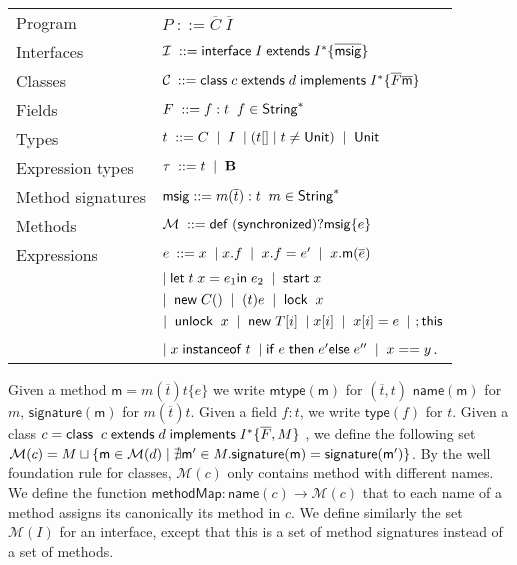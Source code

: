 \documentclass[a4paper, 11pt, english]{article}
\begin{document}
\begin{tabular}{l l}
Program  & $ P \; ::= \overline{C} \; \overline{I}$ \\
Interfaces & $\mathcal{I} \; :: = \mathsf{interface}{} \; I \; \mathsf{extends} \; I^* \{ \overline{\mathsf{msig}} \} $\\
Classes & $ \mathcal{C} \: ::= \mathsf{class} \;{} c \; \mathsf{extends} \;{} d \; \mathsf{implements} \; I^* \{\overline{F} \overline{\mathsf{m}}\} $ \\
Fields & $ F \; ::= f: t \; \; f \in \mathsf{String}^*$ \\
Types & $t \; ::= C \; \mid \; I \; \mid (t[] \mid t \neq \mathsf{Unit}) \; \mid \; \mathsf{Unit}  \; $ \\
Expression types & $\tau \; ::= t \; \mid \; \mathbf{B}$ \\
Method signatures & $\mathsf{msig} ::= m(\overline{t}):t \; \; m \in \mathsf{String}^*$ \\
Methods & $\mathcal{M} \; ::= \mathsf{def} \; (\mathsf{synchronized})? \mathsf{msig} \{e  \} $ \\
Expressions & $ e \: ::=  x \; \mid x.f \; \mid \;x.f = e' \; \mid \; x.\mathsf{m}(\overline{e}) \;  $\\ &$ \mid \mathsf{let} \; t\; x = e_1 \mathsf{in} \; e_2 \; \mid \; \mathsf{start} \; x$ \\ 
& $ \mid \; \mathsf{new}{} \; C() \; \mid \; (t) e \; \mid \; \mathsf{lock} \;{} \; x \; $\\ & $  \mid \; \mathsf{unlock} \;{} \; x \; \mid \; \mathsf{new}{}\; T[i] \; \mid x[i] \; \mid \; x[i] = e \;  \mid \ ;\mathsf{this}$
\\ & $ \mid x \; \mathsf{instanceof} \; t  \; \mid \mathsf{if} \; e \; \mathsf{then} \; e' \mathsf{else} \; e'' \; \mid \; x == y $.
\end{tabular}

\newcommand{\Methods}{\mathcal{M}}
\newcommand{\mtype}{\mathsf{mtype}}
\newcommand{\name}{\mathsf{name}}
\newcommand{\Implements}{\mathsf{Impl}}
\newcommand{\Msig}{Msig}
\newcommand{\Fields}{\mathsf{Fields}}
\newcommand{\signature}{\mathsf{signature}}
\newcommand{\m}{\mathsf{m}}
\newcommand{\type}{\mathsf{type}}
\newcommand{\CoI}{\mathsf{D}}
\newcommand{\fieldsFunction}{\mathsf{fieldMap}}
\newcommand{\methodmap}{\mathsf{methodMap}}
Given a method $\m = m(\overline{t})t\{e\}$ we write $\mtype(\m)$ for $(\overline{t}, t)$  $\name(\m)$ for $m$, $\signature(\m)$ for $m(\overline{t})t$. Given a field $f : t$, we write $\type(f)$ for $t$.
Given a class $c = \mathsf{class} \; \; c \; \mathsf{extends} \; d \\ \; \mathsf{implements} \; I^* \{\overline{F}, M  \}$ , we define the following set  $\Methods(c) = M \sqcup \{ \m \in \Methods(d) \mid \nexists \method' \in M. \signature(\method) = \signature(\method')  \}$. By the well foundation rule for classes, $\Methods(c)$ only contains method with different names.  We define the function $\methodmap :  \name(c) \rightarrow \Methods(c)$ that to each name of a method assigns its canonically its method in $c$. We define similarly the set $\Methods(I)$ for an interface, except that this is a set of method signatures instead of a set of methods.
\end{document}
